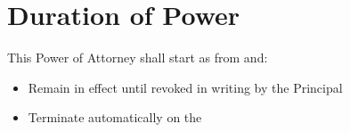 
\section{Duration of Power}
\label{sec:powerduration}

This Power of Attorney shall start as from \PoAStartDate{} and:
\begin{itemize}
  \item[$\square$] Remain in effect until revoked in writing by the Principal
  \item[$\square$] Terminate automatically on the \PoAEndDate{}
\end{itemize}

